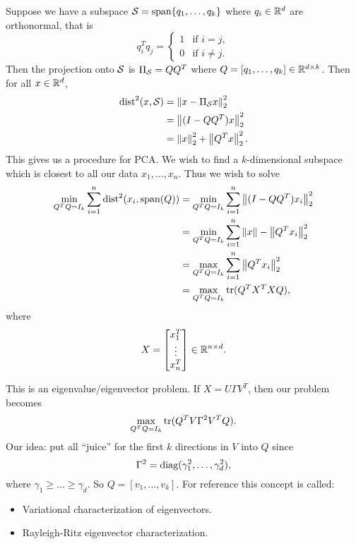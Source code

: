 Suppose we have a subspace $\mathcal{S} = \operatorname{span}\{q_1,\ldots, q_k\}$ where $q_i \in {\mathbb R}^d$ are orthonormal, that is
\[q_i^Tq_j = \begin{cases}
    1 & \text{if } i = j,\\
    0 & \text{if } i \neq j.
\end{cases} \]
Then the projection onto $\mathcal{S}$ is $\Pi_{\mathcal{S}} = QQ^T$ where $Q = [q_1,\ldots,q_k] \in {\mathbb R}^{d \times k}$. Then for all $x \in {\mathbb R}^d$,
\begin{align*}
    \text{dist}^2(x,\mathcal{S}) &= \left\|x-\Pi_{\mathcal{S}} x\right\|_2^2\\
    &= \left\|(I-QQ^T)x\right\|_2^2\\
    &=\left\|x\right\|_2^2+\left\|Q^Tx\right\|_2^2.
\end{align*}
This gives us a procedure for PCA. We wish to find a $k$-dimensional subspace which is closest to all our data $x_1,\ldots, x_n$. Thus we wish to solve
\begin{align*}
    \min_{Q^TQ = I_k} \sum_{i=1}^n \text{dist}^2(x_i, \operatorname{span}(Q)) &=\min_{Q^TQ=I_k}\sum_{i=1}^n \left\|(I-QQ^T)x_i\right\|_2^2\\
    &=\min_{Q^TQ=I_k}\sum_{i=1}^n \left\|x\right\|-\left\|Q^Tx_i\right\|_2^2\\
    &=\max_{Q^TQ = I_k}\sum_{i=1}^n \left\|Q^T x_i\right\|_2^2 \\
    &= \max_{Q^TQ=I_k} \operatorname*{tr}(Q^TX^TXQ),
\end{align*}
where 
\[X = \begin{bmatrix}
    x_1^T\\\vdots \\ x_n^T 
\end{bmatrix} \in {\mathbb R}^{n \times d}.\]
\begin{remark}
    This is an eigenvalue/eigenvector problem. If $X = U\Gamma V^T$, then our problem becomes 
    \[\max_{Q^TQ = I_k} \operatorname*{tr}(Q^TV\Gamma^2 V^T Q). \]
    Our idea: put all ``juice'' for the first $k$ directions in $V$ into $Q$ since 
    \[\Gamma^2 = \operatorname*{diag}(\gamma_1^2,\ldots, \gamma_d^2), \]
    where $\gamma_1 \ge \ldots \ge \gamma_d$. So $Q=[v_1,\ldots, v_k]$. For reference this concept is called:
    \begin{itemize}
        \item Variational characterization of eigenvectors.
        \item Rayleigh-Ritz eigenvector characterization.
    \end{itemize}
\end{remark}
